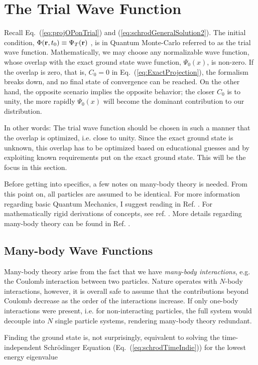\section{The Trial Wave Function}
\label{sec:trialWF}

Recall Eq.~(\ref{eq:projOPonTrial}) and (\ref{eq:schrodGeneralSolution2}). The initial condition, $\Phi(\mathbf{r}, t_0) \equiv \Psi_T(\mathbf{r})$ ,
is in Quantum Monte-Carlo referred to as the trial wave function. Mathematically, we may choose any normalizable wave function, whose overlap with the exact ground state wave function, $\Psi_0(x)$, is non-zero. If the overlap is zero, that is, $C_0=0$ in Eq.~(\ref{eq:ExactProjection}), the formalism breaks down, and no final state of convergence can be reached. On the other hand, the opposite scenario implies the opposite behavior; the closer $C_0$ is to unity, the more rapidly $\Psi_0(x)$ will become the dominant contribution to our distribution. 

In other words: The trial wave function should be chosen in such a manner that the overlap is optimized, i.e. close to unity. Since the exact ground state is unknown, this overlap has to be optimized based on educational guesses and by exploiting known requirements put on the exact ground state. This will be the focus in this section.  

Before getting into specifics, a few notes on many-body theory is needed. From this point on, all particles are assumed to be identical. For more information regarding basic Quantum Mechanics, I suggest reading in Ref. \cite{griffiths}. For mathematically rigid derivations of concepts, see ref. \cite{Sakurai:94}. More details regarding many-body theory can be found in Ref. \cite{Shavitt}. 

\subsection{Many-body Wave Functions}
\label{sec:manyBodyWFs}

Many-body theory arise from the fact that we have \textit{many-body interactions}, e.g. the Coulomb interaction between two particles. Nature operates with $N$-body interactions, however, it is overall safe to assume that the contributions beyond Coulomb decrease as the order of the interactions increase. If only one-body interactions were present, i.e. for non-interacting particles, the full system would decouple into $N$ single particle systems, rendering many-body theory redundant.

Finding the ground state is, not surprisingly, equivalent to solving the time-independent Schrödinger Equation (Eq.~(\ref{eq:schrodTimeIndie})) for the lowest energy eigenvalue

